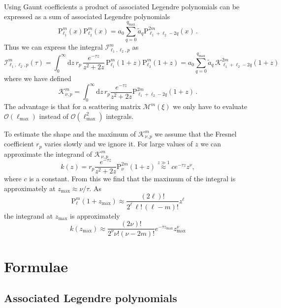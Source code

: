 \documentclass[10pt]{article}
\newcommand{\e}{e}    %
\newcommand{\Plm}[2]{{\text{P}_{#1}^{#2}}}
\newcommand{\lmax}{{\ell_\text{max}}}
\newcommand{\tmax}{{\text{max}}}
\begin{document}
Using Gaunt coefficients a product of associated Legendre polynomials can be expressed as a sum of associated Legendre polynomials
\begin{equation}
\Plm{\ell_1}{m}(x) \Plm{\ell_2}{m}(x) = a_0 \sum_{q=0}^{q_\tmax} \tilde a_q \Plm{\ell_1+\ell_2-2q}{2m}(x) \,.
\end{equation}
Thus we can express the integral $\mathcal{I}_{\ell_1,\ell_2,p}^{m}$ as
\begin{equation}
\mathcal{I}_{\ell_1,\ell_2,p}^{m}(\tau) = \int_0^\infty \mathrm{d}z \, r_p \, \frac{\e^{-\tau z}}{z^2+2z} \, \Plm{\ell_1}{m}(1+z) \Plm{\ell_2}{m}(1+z)
 = a_0 \sum_{q=0}^{q_\tmax} \tilde a_q \, \mathcal{K}_{\ell_1+\ell_2-2q}^{2m}(1+z)
\end{equation}
where we have defined
\begin{equation}
\mathcal{K}_{\nu,p}^m = \int_0^\infty \mathrm{d}z \, r_p \frac{\e^{-\tau z}}{z^2+2z} \Plm{\ell_1+\ell_2-2q}{2m}(1+z) \,.
\end{equation}
The advantage is that for a scattering matrix $\mathcal{M}^m(\xi)$ we only have
to evaluate $\mathcal{O}(\lmax)$ instead of $\mathcal{O}(\ell_\tmax^2)$
integrals.

To estimate the shape and the maximum of $\mathcal{K}_{\nu,p}^m$ we assume that
the Fresnel coefficient $r_p$ varies slowly and we ignore it. For large values
of $z$ we can approximate the integrand of $\mathcal{K}_{\nu,p}^m$
\begin{equation}
k(z) = r_p \frac{\e^{-\tau z}}{z^2+2z} \Plm{\nu}{2m}(1+z) \overset{z \gg 1}{\approx} c \e^{-\tau z} z^\nu ,
\end{equation}
where $c$ is a constant. From this we find that the maximum of the integral is approximately at $z_\tmax \approx \nu/\tau$.
As
\begin{equation}
\Plm{\ell}{m}(1+z_\tmax) \approx \frac{(2\ell)!}{2^\ell \, \ell! \, (\ell-m)!} z^\ell
\end{equation}
the integrand at $z_\tmax$ is approximately
\begin{equation}
k(z_\tmax) \approx \frac{(2\nu)!}{2^\nu \nu! (\nu-2m)!} \e^{-\tau z_\tmax} z_\tmax^\nu
\end{equation}

\appendix

\section{Formulae}


\subsection{Associated Legendre polynomials}
\end{document}
